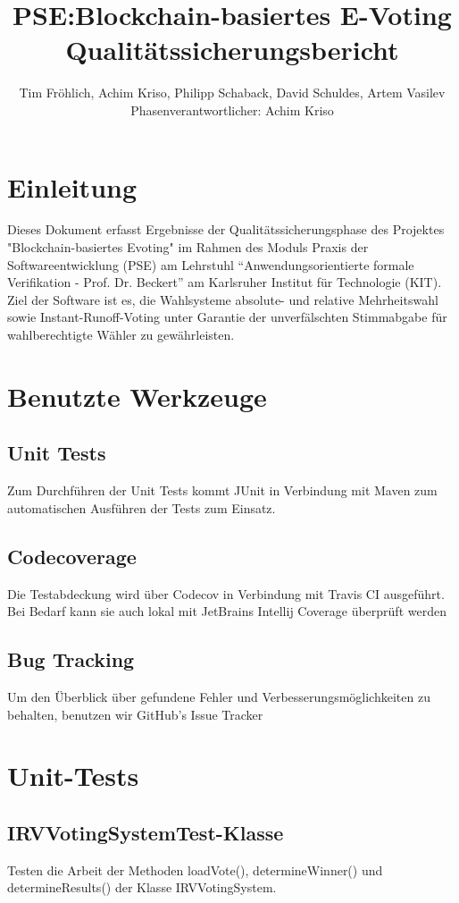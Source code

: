 \documentclass[parskip=full]{scrartcl}
\title{
	PSE:Blockchain-basiertes E-Voting \\
	Qualitätssicherungsbericht
}
\author{Tim Fröhlich, Achim Kriso, Philipp Schaback, David Schuldes, Artem Vasilev\\ Phasenverantwortlicher: Achim Kriso}
\begin{document}
\clearpage
\maketitle
{}
\newpage

\tableofcontents
\newpage
{}

\section{Einleitung}
Dieses Dokument erfasst Ergebnisse der Qualitätssicherungsphase des Projektes "Blockchain-basiertes Evoting" im Rahmen des Moduls Praxis der Softwareentwicklung (PSE) am Lehrstuhl \enquote{Anwendungsorientierte formale Verifikation - Prof. Dr. Beckert} am Karlsruher Institut für Technologie (KIT).\\
Ziel der Software ist es, die Wahlsysteme absolute- und relative Mehrheitswahl sowie Instant-Runoff-Voting unter Garantie der unverfälschten Stimmabgabe für wahlberechtigte Wähler zu gewährleisten.

\section{Benutzte Werkzeuge}
\subsection{Unit Tests}
Zum Durchführen der Unit Tests kommt JUnit in Verbindung mit Maven zum automatischen Ausführen der Tests zum Einsatz. 
\subsection{Codecoverage}
Die Testabdeckung wird über Codecov in Verbindung mit Travis CI ausgeführt. Bei Bedarf kann sie auch lokal mit JetBrains Intellij Coverage überprüft werden
\subsection{Bug Tracking}
Um den Überblick über gefundene Fehler und Verbesserungsmöglichkeiten zu behalten, benutzen wir GitHub's Issue Tracker

\section{Unit-Tests} %
\subsection{IRVVotingSystemTest-Klasse}  
Testen die Arbeit der Methoden loadVote(), determineWinner() und determineResults() der Klasse IRVVotingSystem. 
\end{document}
